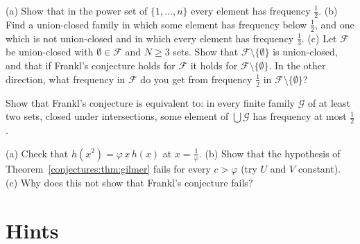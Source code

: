 \begin{exercise}[$\star$]\label{conjectures:ex:ucsharp}
(a) Show that in the power set of $\{1,\dots,n\}$ every element has frequency $\frac12$. (b) Find a union-closed family in which some element has
frequency below $\frac12$, and one which is not union-closed and in which every element has frequency $\frac13$. (c) Let $\mathcal F$ be union-closed with
$\emptyset\in\mathcal F$ and $N\ge3$ sets. Show that $\mathcal F\setminus\{\emptyset\}$ is union-closed, and that if Frankl's conjecture holds for
$\mathcal F$ it holds for $\mathcal F\setminus\{\emptyset\}$. In the other direction, what frequency in $\mathcal F$ do you get from frequency
$\frac12$ in $\mathcal F\setminus\{\emptyset\}$?
\end{exercise}

\begin{exercise}[$\star$]\label{conjectures:ex:ucdual}
Show that Frankl's conjecture is equivalent to: in every finite family $\mathcal G$ of at least two sets, closed under intersections, some element of
$\bigcup\mathcal G$ has frequency at most $\frac12$.
\end{exercise}

\begin{exercise}[$\star\star$]\label{conjectures:ex:ucgolden}
(a) Check that $h(x^2)=\varphi\,x\,h(x)$ at $x=\frac1\varphi$. (b) Show that the hypothesis of Theorem~\ref{conjectures:thm:gilmer} fails for every $c>\varphi$ (try
$U$ and $V$ constant). (c) Why does this not show that Frankl's conjecture fails?
\end{exercise}

\section{Hints}

